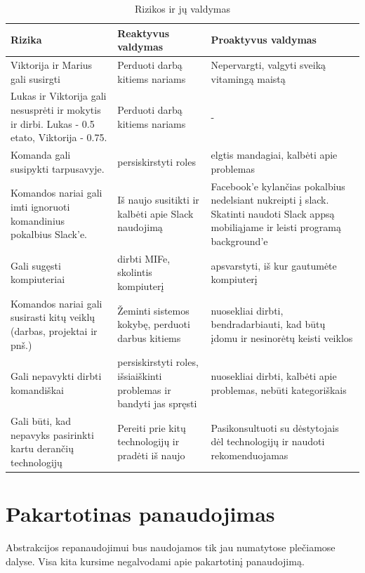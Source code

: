 \documentclass[11pt]{article}
\begin{document}
\begin{table}[H]
\centering
\caption{Rizikos ir jų valdymas}
\label{table:ta}
\noindent\begin{tabu} to \textwidth {|X|X|X|}
   \toprule
   Rizika & Reaktyvus valdymas & Proaktyvus valdymas  \\
   \bottomrule
   Viktorija ir Marius gali susirgti & Perduoti darbą kitiems nariams & Nepervargti, valgyti sveiką vitamingą maistą \\
   \hline
   Lukas ir Viktorija gali nesusprėti ir mokytis ir dirbi. Lukas - 0.5 etato, Viktorija - 0.75. & Perduoti darbą kitiems nariams & - \\
   \hline
   Komanda gali susipykti tarpusavyje. & persiskirstyti roles & elgtis mandagiai, kalbėti apie problemas\\
   \hline
   Komandos nariai gali imti ignoruoti komandinius pokalbius Slack'e. & Iš naujo susitikti ir kalbėti apie Slack naudojimą & Facebook'e kylančias pokalbius nedelsiant nukreipti į slack. Skatinti naudoti Slack appsą mobiliąjame ir leisti programą background'e \\
   \hline
   Gali sugęsti kompiuteriai & dirbti MIFe, skolintis kompiuterį & apsvarstyti, iš kur gautumėte kompiuterį\\
   \hline
   Komandos nariai gali susirasti kitų veiklų (darbas, projektai ir pnš.) & Žeminti sistemos kokybę, perduoti darbus kitiems & nuosekliai dirbti, bendradarbiauti, kad būtų įdomu ir nesinorėtų keisti veiklos \\
   \hline
   Gali nepavykti dirbti komandiškai & persiskirstyti roles, išsiaiškinti problemas ir bandyti jas spręsti & nuosekliai dirbti, kalbėti apie problemas, nebūti kategoriškais\\
   \hline
   Gali būti, kad nepavyks pasirinkti kartu derančių technologijų & Pereiti prie kitų technologijų ir pradėti iš naujo & Pasikonsultuoti su dėstytojais dėl technologijų ir naudoti rekomenduojamas\\
   \hline
\end{tabu}

\end{table}

\section{Pakartotinas panaudojimas}
Abstrakcijos repanaudojimui bus naudojamos tik jau numatytose plečiamose dalyse. Visa kita kursime negalvodami apie pakartotinį panaudojimą.
\end{document}
